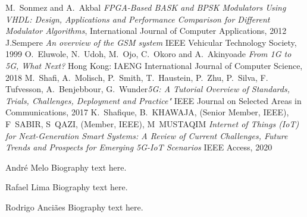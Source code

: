 \documentclass[10pt,journal,compsoc]{IEEEtran}
\begin{document}
\begin{thebibliography}{1}

\bibitem{}M.~Sonmez and A.~Akbal \emph{FPGA-Based BASK and BPSK Modulators Using VHDL:
Design, Applications and Performance Comparison for Different Modulator Algorithms}, International Journal of Computer Applications, 2012
\bibitem{}J.Sempere \emph{An overview of the GSM system} IEEE Vehicular Technology Society, 1999
\bibitem{}O.~Eluwole, N.~Udoh, M.~Ojo, C.~Okoro and A.~Akinyoade \emph{From 1G to 5G, What Next?} Hong Kong: IAENG International Journal of Computer Science, 2018
\bibitem{}M.~Shafi, A.~Molisch, P.~Smith, T.~Haustein, P.~Zhu, P.~Silva, F.~
Tufvesson, A.~Benjebbour, G.~Wunder\emph{5G: A Tutorial Overview of Standards, Trials, Challenges, Deployment and Practice"} IEEE Journal on Selected Areas in Communications, 2017
\bibitem{}K.~Shafique, B.~KHAWAJA, (Senior Member, IEEE), F~SABIR, S~QAZI, (Member, IEEE), M~MUSTAQIM \emph{Internet of Things (IoT) for Next-Generation Smart Systems: A Review of Current Challenges, Future Trends and Prospects for Emerging 5G-IoT Scenarios} IEEE Access, 2020
\end{thebibliography}

\begin{IEEEbiographynophoto}{André Melo}
Biography text here.
\end{IEEEbiographynophoto}

\begin{IEEEbiographynophoto}{Rafael Lima}
Biography text here.
\end{IEEEbiographynophoto}

\begin{IEEEbiographynophoto}{Rodrigo Anciães}
Biography text here.
\end{IEEEbiographynophoto}
\end{document}
